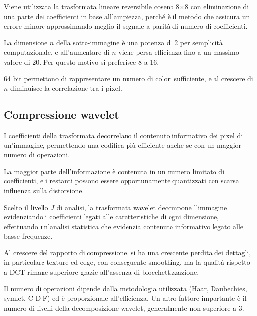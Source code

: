 Viene utilizzata la trasformata lineare reversibile coseno 8$\times$8 con eliminazione di una parte dei coefficienti in base all'ampiezza, perché è il metodo che assicura un errore minore approssimando meglio il segnale a parità di numero di coefficienti. 

La dimensione $n$ della sotto-immagine è una potenza di 2 per semplicità computazionale, e all'aumentare di $n$ viene persa efficienza fino a un massimo valore di 20. Per questo motivo si preferisce 8 a 16.

64 bit permettono di rappresentare un numero di colori sufficiente, e al crescere di $n$ diminuisce la correlazione tra i pixel.

\newpage
\subsection{Compressione wavelet}
I coefficienti della trasformata decorrelano il contenuto informativo dei pixel di un'immagine, permettendo una codifica più efficiente anche se con un maggior numero di operazioni.

La maggior parte dell'informazione è contenuta in un numero limitato di coefficienti, e i restanti possono essere opportunamente quantizzati con scarsa influenza sulla distorsione.

Scelto il livello $J$ di analisi, la trasformata wavelet decompone l'immagine evidenziando i coefficienti legati alle caratteristiche di ogni dimensione, effettuando un'analisi statistica che evidenzia contenuto informativo legato alle basse frequenze.

Al crescere del rapporto di compressione, si ha una crescente perdita dei dettagli, in particolare texture ed edge, con conseguente smoothing, ma la qualità rispetto a DCT rimane superiore grazie all'assenza di blocchettizzazione.

Il numero di operazioni dipende dalla metodologia utilizzata (Haar, Daubechies, symlet, C-D-F) ed è  proporzionale all'efficienza. Un altro fattore importante è il numero di livelli della decomposizione wavelet, generalmente non superiore a 3.



